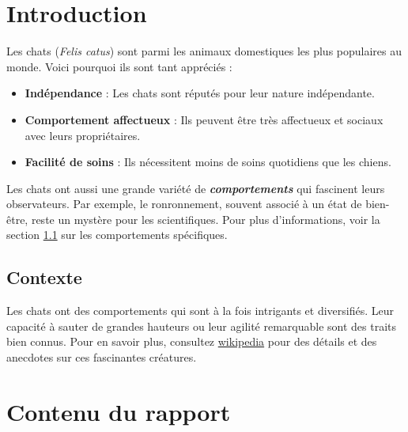 \documentclass{report}
\begin{document}
\begin{abstract}
    balblabalba %
\end{abstract}

\tableofcontents

\chapter{Introduction}

\label{sec:cats}

Les chats (\emph{Felis catus}) sont parmi les animaux domestiques les plus populaires au monde. Voici pourquoi ils sont tant appréciés :

\begin{itemize}
    \item \textbf{Indépendance} : Les chats sont réputés pour leur nature indépendante.
    \item \textbf{Comportement affectueux} : Ils peuvent être très affectueux et sociaux avec leurs propriétaires.
    \item \textbf{Facilité de soins} : Ils nécessitent moins de soins quotidiens que les chiens.
\end{itemize}


\par %
\smallskip %
\noindent %
Les chats ont aussi une grande variété de \textbf{\emph{comportements}} qui fascinent leurs observateurs. Par exemple, le ronronnement, souvent associé à un état de bien-être, reste un mystère pour les scientifiques. Pour plus d'informations, voir la section \ref{sec:behaviors} sur les comportements spécifiques.

\section{Contexte}
\label{sec:behaviors}
\noindent %
Les chats ont des comportements qui sont à la fois intrigants et diversifiés. Leur capacité à sauter de grandes hauteurs ou leur agilité remarquable sont des traits bien connus. Pour en savoir plus, consultez \href{https://fr.wikipedia.org/wiki/Chat}{wikipedia} pour des détails et des anecdotes sur ces fascinantes créatures.


\chapter{Contenu du rapport}
\end{document}
